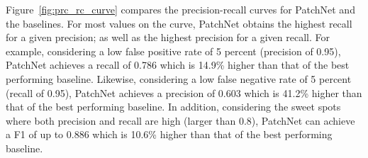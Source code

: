 

Figure~\ref{fig:prc_rc_curve} compares the precision-recall curves for
PatchNet and the baselines. For most values
on the curve, PatchNet obtains the highest recall for a given precision; as well as the highest precision for a given recall. For example, considering a low false positive rate of 5 percent (precision of 0.95), PatchNet achieves a recall of 0.786 which is 14.9\% higher than that of the best performing baseline. Likewise, considering a low false negative rate of 5 percent (recall of 0.95), PatchNet achieves a precision of 0.603 which is 41.2\% higher than that of the best performing baseline. In addition, considering the sweet spots where both precision and recall are high (larger than 0.8), PatchNet can achieve a F1 of up to 0.886 which is 10.6\% higher than that of the best performing baseline.





